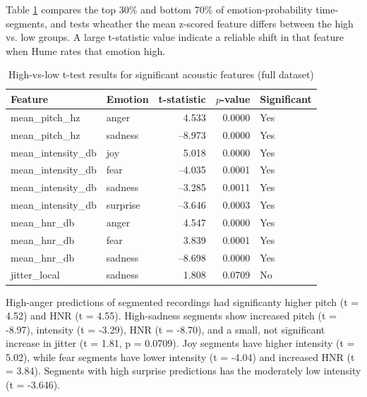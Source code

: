 Table \ref{tab:ttest_full_features} compares the top 30\% and bottom 70\% of emotion-probability time-segments, and tests wheather the mean z-scored feature differs between the high vs. low groups. 
A large t-statistic value indicate a reliable shift in that feature when Hume rates that emotion high. 
\begin{table}[H]
    \centering
    \begin{tabular}{l l r r l}
      \toprule
      \textbf{Feature} & \textbf{Emotion} & \textbf{t-statistic} & \textbf{\(p\)-value} & \textbf{Significant} \\
      \midrule
      mean\_pitch\_hz       & anger     &  4.533 & 0.0000 & Yes \\
      mean\_pitch\_hz       & sadness   & –8.973 & 0.0000 & Yes \\
      mean\_intensity\_db   & joy       &  5.018 & 0.0000 & Yes \\
      mean\_intensity\_db   & fear      & –4.035 & 0.0001 & Yes \\
      mean\_intensity\_db   & sadness   & –3.285 & 0.0011 & Yes \\
      mean\_intensity\_db   & surprise  & –3.646 & 0.0003 & Yes \\
      mean\_hnr\_db         & anger     &  4.547 & 0.0000 & Yes \\
      mean\_hnr\_db         & fear      &  3.839 & 0.0001 & Yes \\
      mean\_hnr\_db         & sadness   & –8.698 & 0.0000 & Yes \\
      jitter\_local         & sadness   &  1.808 & 0.0709 & No  \\
      \bottomrule
    \end{tabular}
    \caption{High-vs-low t-test results for significant acoustic features (full dataset)}
    \label{tab:ttest_full_features}
  \end{table}
  
  High-anger predictions of segmented recordings had significanty higher pitch (t = 4.52) and HNR (t = 4.55). 
  High-sadness segments show increased pitch (t = -8.97), intensity (t = -3.29), HNR (t = -8.70), and a small, not significant increase in jitter (t = 1.81, p = 0.0709).
  Joy segments have higher intensity (t = 5.02), while fear segments have lower intensity (t = -4.04) and increased HNR (t = 3.84). 
  Segments with high surprise predictions has the moderately low intensity (t = -3.646). 
  

